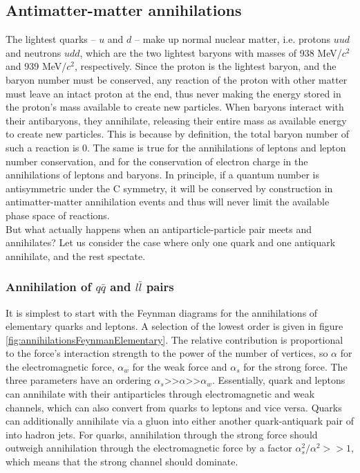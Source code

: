 \subsection{Antimatter-matter annihilations}
The lightest quarks -- $u$ and $d$ -- make up normal nuclear matter, i.e. protons $uud$ and neutrons $udd$, which are the two lightest baryons with masses of 938 MeV/$c^2$ and 939 MeV/$c^2$, respectively. Since the proton is the lightest baryon, and the baryon number must be conserved, any reaction of the proton with other matter must leave an intact proton at the end, thus never making the energy stored in the proton's mass available to create new particles. When baryons interact with their antibaryons, they annihilate, releasing their entire mass as available energy to create new particles. This is because by definition, the total baryon number of such a reaction is 0. The same is true for the annihilations of leptons and lepton number conservation, and for the conservation of electron charge in the annihilations of leptons and baryons. In principle, if a quantum number is antisymmetric under the C symmetry, it will be conserved by construction in antimatter-matter annihilation events and thus will never limit the available phase space of reactions. \\

But what actually happens when an antiparticle-particle pair meets and annihilates? Let us consider the case where only one quark and one antiquark annihilate, and the rest spectate. 

\subsubsection{Annihilation of $q\bar{q}$ and $l\bar{l}$ pairs}
It is simplest to start with the Feynman diagrams for the annihilations of elementary quarks and leptons. A selection of the lowest order is given in figure \ref{fig:annihilationsFeynmanElementary}. The relative contribution is proportional to the force's interaction strength to the power of the number of vertices, so $\alpha$ for the electromagnetic force, $\alpha_w$ for the weak force and $\alpha_s$ for the strong force. The three parameters have an ordering $\alpha_s$>>$\alpha$>>$\alpha_w$. Essentially, quark and leptons can annihilate with their antiparticles through electromagnetic and weak channels, which can also convert from quarks to leptons and vice versa. Quarks can additionally annihilate via a gluon into either another quark-antiquark pair of into hadron jets. For quarks, annihilation through the strong force should outweigh annihilation through the electromagnetic force by a factor $\alpha_s^2/\alpha^2 >>1$, which means that the strong channel should dominate. 

